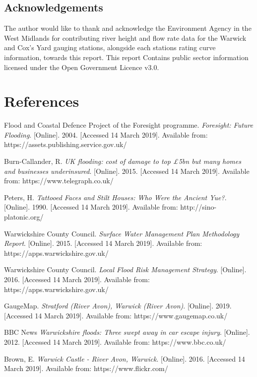 \documentclass[11pt,a4paper]{article}
\begin{document}
\subsection{Acknowledgements}
The author would like to thank and acknowledge the Environment Agency in the West Midlands for contributing river height and flow rate data for the Warwick and Cox's Yard gauging stations, alongside each stations rating curve information, towards this report. This report Contains public sector information licensed under the Open Government Licence v3.0.

\newpage
\section{References}
\begin{thebibliography}{}
Flood and Coastal Defence Project of the Foresight programme. \textit{Foresight: Future Flooding}. [Online]. 2004. [Accessed 14 March 2019]. Available from: https://assets.publishing.service.gov.uk/

Burn-Callander, R. \textit{UK flooding: cost of damage to top £5bn but many homes and businesses underinsured}. [Online]. 2015. [Accessed 14 March 2019]. Available from: https://www.telegraph.co.uk/

Peters, H. \textit{Tattooed Faces and Stilt Houses: Who Were the Ancient Yue?}. [Online]. 1990. [Accessed 14 March 2019]. Available from: http://sino-platonic.org/

\bibitem{}
Warwickshire County Council. \textit{Surface Water Management Plan Methodology Report}. [Online]. 2015. [Accessed 14 March 2019]. Available from: https://apps.warwickshire.gov.uk/

\bibitem{}
Warwickshire County Council. \textit{Local Flood Risk Management Strategy}. [Online]. 2016. [Accessed 14 March 2019]. Available from: https://apps.warwickshire.gov.uk/

\bibitem{}
GaugeMap. \textit{Stratford (River Avon), Warwick (River Avon)}. [Online]. 2019. [Accessed 14 March 2019]. Available from: https://www.gaugemap.co.uk/

\bibitem{}
BBC News \textit{Warwickshire floods: Three swept away in car escape injury}. [Online]. 2012. [Accessed 14 March 2019]. Available from: https://www.bbc.co.uk/

Brown, E. \textit{Warwick Castle - River Avon, Warwick}. [Online]. 2016. [Accessed 14 March 2019]. Available from: https://www.flickr.com/


\end{thebibliography}
\end{document}
